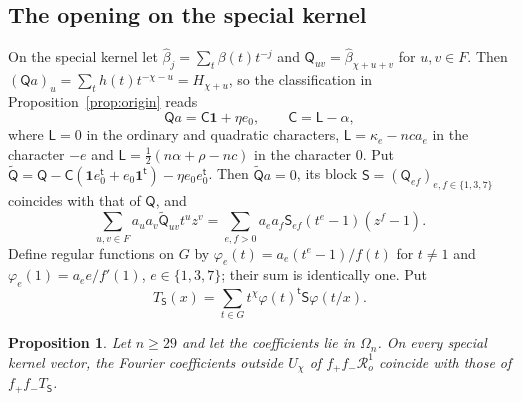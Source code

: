 \documentclass{amsart}
\newtheorem{proposition}[theorem]{Proposition}
\theoremstyle{definition}
\theoremstyle{remark}
\numberwithin{equation}{section}
\begin{document}
\subsection{The opening on the special kernel}
On the special kernel let $\hat\beta_j=\sum_t\beta(t)t^{-j}$ and
$\mathsf Q_{uv}=\hat\beta_{\chi+u+v}$ for $u,v\in F$. Then
$(\mathsf Qa)_u=\sum_t h(t)t^{-\chi-u}=H_{\chi+u}$, so the classification in
Proposition~\ref{prop:origin} reads
\begin{equation}\label{eq:Qa}
  \mathsf Qa=\mathsf C\mathbf 1+\eta e_0,\qquad \mathsf C=\mathsf L-\alpha,
\end{equation}
where $\mathsf L=0$ in the ordinary and quadratic characters,
$\mathsf L=\kappa_e-nca_e$ in the character $-e$ and $\mathsf L=\frac12(n\alpha+\rho-nc)$
in the character $0$. Put
$\tilde{\mathsf Q}=\mathsf Q-\mathsf C(\mathbf1e_0^{\mathsf t}+e_0\mathbf1^{\mathsf t})
-\eta e_0e_0^{\mathsf t}$. Then $\tilde{\mathsf Q}a=0$, its block
$\mathsf S=(\mathsf Q_{ef})_{e,f\in\{1,3,7\}}$ coincides with that of $\mathsf Q$, and
\begin{equation}\label{eq:Qtilde}
  \sum_{u,v\in F}a_ua_v\tilde{\mathsf Q}_{uv}t^uz^v
   =\sum_{e,f>0}a_ea_f\mathsf S_{ef}(t^e-1)(z^f-1).
\end{equation}
Define regular functions on $G$ by $\varphi_e(t)=a_e(t^e-1)/f(t)$ for $t\ne1$ and
$\varphi_e(1)=a_ee/f'(1)$, $e\in\{1,3,7\}$; their sum is identically one. Put
\begin{equation}\label{eq:TS}
  T_{\mathsf S}(x)=\sum_{t\in G}t^\chi\varphi(t)^{\mathsf t}\mathsf S\varphi(t/x).
\end{equation}

\begin{proposition}\label{prop:openingidentity}
Let $n\ge29$ and let the coefficients lie in $\Omega_n$. On every special kernel
vector, the Fourier coefficients outside $U_\chi$ of $f_+f_-\mathcal R^1_o$ coincide
with those of $f_+f_-T_{\mathsf S}$.
\end{proposition}
\end{document}
